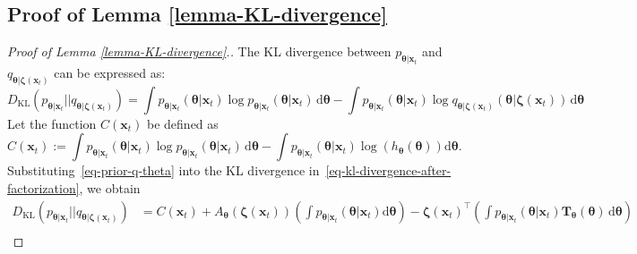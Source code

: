 \subsection{Proof of Lemma \ref{lemma-KL-divergence}} \label{sec:proof_lemma-KL-divergence}
\begin{proof}[Proof of Lemma \ref{lemma-KL-divergence}.]
The KL divergence between $ p_{\boldsymbol{\theta}|\mathbf{x}_t} $ and $ q_{\boldsymbol{\theta}|\boldsymbol{\zeta}(\mathbf{x}_t)} $ can be expressed as:
\begin{equation}
\label{eq-kl-divergence-after-factorization}
   D_{\text{KL}}(p_{\boldsymbol{\theta}|\mathbf{x}_t} \vert\vert q_{\boldsymbol{\theta}|\boldsymbol{\zeta}(\mathbf{x}_t)})=  \int p_{\boldsymbol{\theta}|\mathbf{x}_t}(\boldsymbol{\theta}\vert \mathbf{x}_{t}) \log p_{\boldsymbol{\theta}|\mathbf{x}_t}(\boldsymbol{\theta}\vert \mathbf{x}_{t}) \, \mathrm{d}\boldsymbol{\theta} - \int p_{\boldsymbol{\theta}|\mathbf{x}_t}(\boldsymbol{\theta}\vert \mathbf{x}_{t}) \log q_{\boldsymbol{\theta}|\boldsymbol{\zeta}(\mathbf{x}_t)}(\boldsymbol{\theta}\vert \boldsymbol{\zeta}(\mathbf{x}_t)) \, \mathrm{d}\boldsymbol{\theta}
\end{equation}
Let the function $ C(\mathbf{x}_t) $ be defined as
\begin{equation*}
C(\mathbf{x}_t) := \int p_{\boldsymbol{\theta}|\mathbf{x}_t}(\boldsymbol{\theta}\vert \mathbf{x}_{t}) \log p_{\boldsymbol{\theta}|\mathbf{x}_t}(\boldsymbol{\theta}\vert \mathbf{x}_{t}) \, \mathrm{d}\boldsymbol{\theta} -  \int p_{\boldsymbol{\theta}|\mathbf{x}_t}(\boldsymbol{\theta}\vert \mathbf{x}_{t}) \log(h_{\boldsymbol{\theta}}(\boldsymbol{\theta})) \mathrm{d}\boldsymbol{\theta}.
\end{equation*}
Substituting~\eqref{eq-prior-q-theta} into the KL divergence in~\eqref{eq-kl-divergence-after-factorization}, we obtain
\begin{equation}
\label{eq-kl-divergence-before-cov}
\begin{aligned}
   D_{\text{KL}}(p_{\boldsymbol{\theta}|\mathbf{x}_t} \vert\vert q_{\boldsymbol{\theta}|\boldsymbol{\zeta}(\mathbf{x}_t)}) &= C(\mathbf{x}_t)  +  A_{\boldsymbol{\theta}}(\boldsymbol{\zeta}(\mathbf{x}_t)) \left( \int p_{\boldsymbol{\theta}|\mathbf{x}_t}(\boldsymbol{\theta}\vert \mathbf{x}_{t}) \mathrm{d}\boldsymbol{\theta} \right) - \boldsymbol{\zeta}(\mathbf{x}_t)^\top \left( \int p_{\boldsymbol{\theta}|\mathbf{x}_t}(\boldsymbol{\theta}\vert \mathbf{x}_{t}) \mathbf{T}_{\boldsymbol{\theta}}(\boldsymbol{\theta}) \, \mathrm{d}\boldsymbol{\theta} \right) \\

\end{aligned}
\end{equation}
\end{proof}
